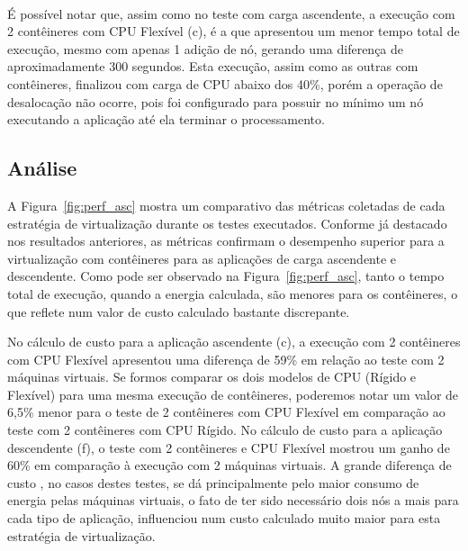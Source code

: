 \documentclass[twoside,english,brazilian]{UNISINOSartigo}
\begin{document}
\begin{figure}[ht!]
\vspace{-0.4\baselineskip}
\\

\label{fig:trend_des}
\end{figure}


É possível notar que, assim como no teste com carga ascendente, a execução com 2 contêineres com CPU Flexível (c), é a que apresentou um menor tempo total de execução, mesmo com apenas 1 adição de nó, gerando uma diferença de aproximadamente 300 segundos. Esta execução, assim como as outras com contêineres, finalizou com carga de CPU abaixo dos 40\%, porém a operação de desalocação não ocorre, pois foi configurado para possuir no mínimo um nó executando a aplicação até ela terminar o processamento.




\subsection{Análise}
A Figura~\ref{fig:perf_asc} mostra um comparativo das métricas coletadas de cada estratégia de virtualização durante os testes executados. Conforme já destacado nos resultados anteriores, as métricas confirmam o desempenho superior para a virtualização com contêineres para as aplicações de carga ascendente e descendente. Como pode ser observado na Figura~\ref{fig:perf_asc}, tanto o tempo total de execução, quando a energia calculada, são menores para os contêineres, o que reflete num valor de custo calculado bastante discrepante. 

No cálculo de custo para a aplicação ascendente (c), a execução com 2 contêineres com CPU Flexível apresentou uma diferença de 59\% em relação ao teste com 2 máquinas virtuais. Se formos comparar os dois modelos de CPU (Rígido e Flexível) para uma mesma execução de contêineres, poderemos notar um valor de 6,5\% menor para o teste de 2 contêineres com CPU Flexível em comparação ao teste com 2 contêineres com CPU Rígido. No cálculo de custo para a aplicação descendente (f), o teste com 2 contêineres e CPU Flexível mostrou um ganho de 60\% em comparação à execução com 2 máquinas virtuais. A grande diferença de custo , no casos destes testes, se dá principalmente pelo maior consumo de energia pelas máquinas virtuais, o fato de ter sido necessário dois nós a mais para cada tipo de aplicação, influenciou num custo calculado muito maior para esta estratégia de virtualização. 
\end{document}

